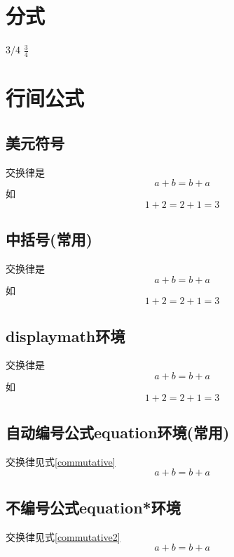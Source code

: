 \documentclass{article}
\begin{document}
	\section{分式}
		$3/4$
		$\frac{3}{4}$
		
	\section{行间公式}	
	\subsection{美元符号}
		交换律是 
		$$a+b=b+a$$
		如 
		$$1+2=2+1=3$$
	\subsection{中括号(常用)}
		交换律是 
		\[a+b=b+a\]
		如 
		\[1+2=2+1=3\]
	\subsection{displaymath环境}
		交换律是
		\begin{displaymath}
		a+b=b+a	
		\end{displaymath}
		如
		\begin{displaymath}
		1+2=2+1=3	
		\end{displaymath}
	\subsection{自动编号公式equation环境(常用)}
		交换律见式\ref{commutative}	%
		\begin{equation}
			a+b=b+a	\label{commutative}	%
		\end{equation}
	\subsection{不编号公式equation*环境}	%
		交换律见式\ref{commutative2}	%
		\begin{equation*}
			a+b=b+a	\label{commutative2}	%
		\end{equation*}
	
\end{document}
